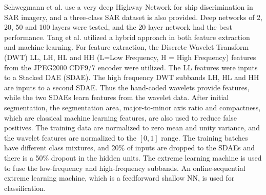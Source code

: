 \documentclass[12pt]{spieman}
\begin{document}
\begin{spacing}{1}
Schwegmann et al. \cite{schwegmann2016very} use a very deep Highway Network for ship discrimination in SAR imagery, and a three-class SAR dataset is also provided. Deep networks of 2, 20, 50 and 100 layers were tested, and the 20 layer network had the best performance. Tang et al. \cite{Tang2015Compressed} utilized a hybrid approach in both feature extraction and machine learning. For feature extraction, the Discrete Wavelet Transform (DWT) LL, LH, HL and HH (L=Low Frequency, H = High Frequency) features from the JPEG2000 CDF9/7 encoder were utilized. The LL features were inputs to a Stacked DAE (SDAE). The high frequency DWT subbands LH, HL and HH are inputs to a second SDAE. Thus the hand-coded wavelets provide features, while the two SDAEs learn features from the wavelet data. After initial segmentation, the segmentation area, major-to-minor axis ratio and compactness, which are classical machine learning features, are also used to reduce false positives. The training data are normalized to zero mean and unity variance, and the wavelet features are normalized to the $[0,1]$ range. The training batches have different class mixtures, and 20\% of inputs are dropped to the SDAEs and there is a 50\% dropout in the hidden units. The extreme learning machine is used to fuse the low-frequency and high-frequency subbands. An online-sequential extreme learning machine, which is a feedforward shallow NN, is used for classification.


\end{spacing}
\end{document}
